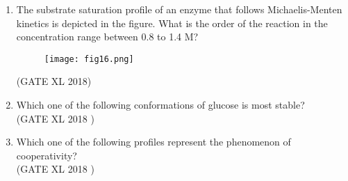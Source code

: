 \documentclass[14pt]{extarticle}
\begin{document}
\begin{flushleft}
\begin{enumerate}[leftmargin=*]
\item The substrate saturation profile of an enzyme that follows Michaelis-Menten kinetics is depicted in the figure. What is the order of the reaction in the concentration range between 0.8 to 1.4 M?\\
\begin{figure}[H]
\centering
\texttt{[image: fig16.png]}\\
\caption{}
\label{fig:q2}
\end{figure}
\hfill(GATE XL 2018)
\begin{enumerate}
\end{enumerate}

\item Which one of the following conformations of glucose is most stable?\\
\hfill(GATE XL 2018 )\\
\begin{enumerate}
\end{enumerate}

\item Which one of the following profiles represent the phenomenon of cooperativity?\\
\hfill(GATE XL 2018 )\\
\begin{enumerate}
\end{enumerate}


\end{enumerate}
\end{flushleft}
\end{document}
